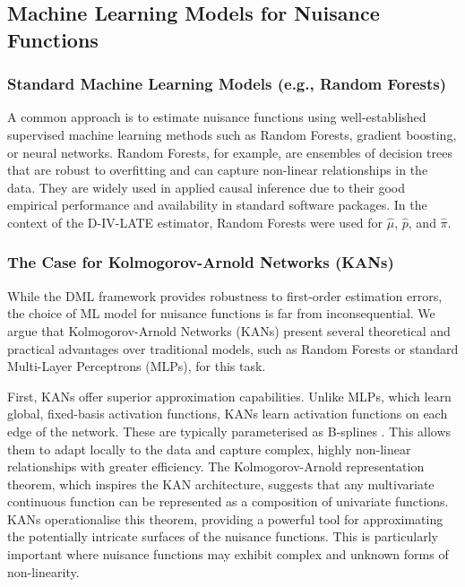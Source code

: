 \documentclass[final,3p,fleqn, 10pt]{elsarticle}
\begin{document}
\subsection{Machine Learning Models for Nuisance Functions}

\subsubsection{Standard Machine Learning Models (e.g., Random Forests)}
A common approach is to estimate nuisance functions using well-established supervised machine learning methods such as Random Forests, gradient boosting, or neural networks. Random Forests, for example, are ensembles of decision trees that are robust to overfitting and can capture non-linear relationships in the data. They are widely used in applied causal inference due to their good empirical performance and availability in standard software packages. In the context of the D-IV-LATE estimator, Random Forests were used for $\hat{\mu}$, $\hat{p}$, and $\hat{\pi}$.

\subsubsection{The Case for Kolmogorov-Arnold Networks (KANs)}
\label{subsubsec:case_for_kans}
While the DML framework provides robustness to first-order estimation errors, the choice of ML model for nuisance functions is far from inconsequential. We argue that Kolmogorov-Arnold Networks (KANs) present several theoretical and practical advantages over traditional models, such as Random Forests or standard Multi-Layer Perceptrons (MLPs), for this task.

First, KANs offer superior approximation capabilities. Unlike MLPs, which learn global, fixed-basis activation functions, KANs learn activation functions on each edge of the network. These are typically parameterised as B-splines \citep{liu2024kan}. This allows them to adapt locally to the data and capture complex, highly non-linear relationships with greater efficiency. The Kolmogorov-Arnold representation theorem, which inspires the KAN architecture, suggests that any multivariate continuous function can be represented as a composition of univariate functions. KANs operationalise this theorem, providing a powerful tool for approximating the potentially intricate surfaces of the nuisance functions. This is particularly important where nuisance functions may exhibit complex and unknown forms of non-linearity.
\end{document}
